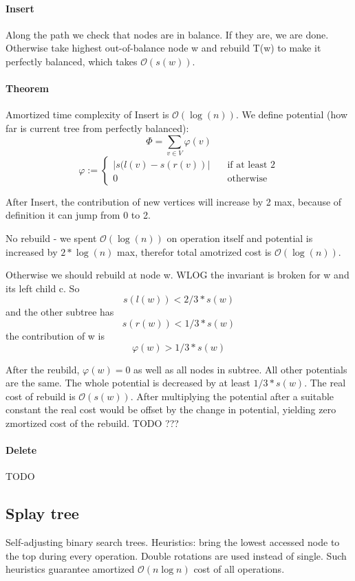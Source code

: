 \documentclass[12pt]{article}
\newcommand{\bigO}{\mathcal{O}}
\begin{document}
\paragraph{Insert} Along the path we check that nodes are in balance. If they are, we are done. Otherwise take highest out-of-balance node w and rebuild T(w) to make it perfectly balanced, which takes $ \bigO(s(w)) $.

\paragraph{Theorem} Amortized time complexity of Insert is $ \bigO(\log(n)) $.
We define potential (how far is current tree from perfectly balanced):
\[ \Phi =  \sum_{v \in V} \varphi(v)\]
\[ \varphi :=
	\begin{cases}
		|  s(l(v) - s(r(v)) | &\quad\text{if at least 2} \\
		\text {0} &\quad\text{otherwise}
	\end{cases}
\]

After Insert, the contribution of new vertices will increase by 2 max, because of definition it can jump from 0 to 2.

No rebuild - we spent $ \bigO(\log(n)) $ on operation itself and potential is increased by $ 2*\log(n) $ max, therefor total amotrized cost is $ \bigO(\log(n)) $.

Otherwise we should rebuild at node w. WLOG the invariant is broken for w and its left child c. So
\[ s(l(w)) < 2/3 * s(w) \]
and the other subtree has
\[ s(r(w)) < 1/3 * s(w) \]
the contribution of w is
\[ \varphi(w) > 1/3 * s(w) \]

After the reubild, $ \varphi(w) = 0 $ as well as all nodes in subtree. All other potentials are the same. The whole potential is decreased by at least $ 1/3 * s(w) $. The real cost of rebuild is $ \bigO(s(w)) $. After multiplying the potential after a suitable constant the real cost would be offset by the change in potential, yielding zero zmortized cost of the rebuild. TODO ???

\paragraph{Delete} TODO


\subsection{Splay tree}

Self-adjusting binary search trees. Heuristics: bring the lowest accessed node to the top during every operation. Double rotations are used instead of single.
Such heuristics guarantee amortized $\bigO(n\log n)$ cost of all operations.
\end{document}
